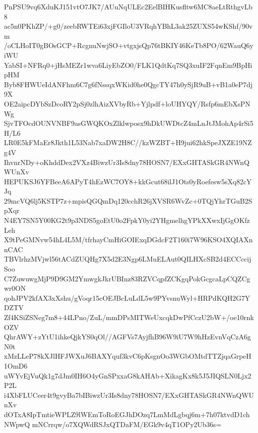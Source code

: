 PnPSU9vq6XduKJ151vtO7JK7/AUuNqULEc2EelBIHKusfltw6MC8aeLtRthgvLb8
ac5n0PKhZP/+g0/zeebRWTEi63xjFGIloU3VRqhYBhL3ak25ZUXS54wKShf/90vm
/oCLHoIT0gBOsGCP+RcgnuNwjSO+vtgxjsQp76tBKIY46KeTb8PO/62WauQ6yiWU
YabSI+NFRq0+jHsMEZr1wva6LiyEbZO0/FLK1QdtKq7SQ3xuIF2FqnEm9BpHipHM
Byb8FHWUeIdANFhm6C7g6fNssqxWKid0he0QgcTY47h0ySjR9uB+vB1a0eP7dj9X
OE2aipcDYbSzDcoRY2pSj0zlhAizXVbyRb+Yjlpdf+loUHYQY/Rsfp6mEbXsPNWg
SjvTFOcdOUNVNBF9asGWQKOxZlklwposx9hDkUWDtcZ4mLnJtJMohAp4rSi5H/L6
LR0E5kFMaEr8Jkth1L53Nab7xaDW2H8C//kzWZBT+H9jui62hkSpeJXZE19NZg4V
IhvnrNDy+oKhddDex2VXz4BiwzUr3Is8dny78HOSN7/EXxGHTASkGR4NWnQWUnXv
HEPUKSJ6YFBeeA6APyT4hEzWC7OY8+kkGcut68ilJ1Ots0yRoefesw5sXq82cYJq
29mcVQ6lj5KSTP7z+mpisQGQmDq120cchR26jXVSR6WvZc+0TQjYhrTGuB2SpXqr
N4EY7SN5Y00KG2t9p3NDS5goEtU0o2FpkY0yi2YHgmelhgYPkXXwxIjGgOKfzLeh
X9tPeGMNvw54hL4L5M/tfrhayCmHiGOIExqDGdcF2T160i7W96KSO4XQIAXnnCAC
TBVlrhzMVjwl56tACdZUQHg7X5d2E3Ngp6LMuELAut0QILHXcSB2d4ECCccijSoo
C7ZuwuwgMjP9D9GM2YmwgkJkrUBInz83RZVCqpfZCKgqPokGcgcaLpCQZCgwr0ON
qohJPV2kfAX3xXshu/gVoqr15cOEJBcLuLdL5w9PYvsnuWyl+HRPdKQH2G7YDZTV
Zf4KSiZSNeg7m8+44LPno/ZuL/mmDPsMITWeUxcqkDwPfCczU2bW+/oe10rnkOZV
QhrAWY+zYtU1ihkeQjkYS0qOl//AGFVs7AyjfhB96W9iU7W9hHzEvnVqCzA6gN0t
xMzLLeP78kXJlHFJWXuJ6BAXYquf3kvC6pKsgnOo3WGbOMtdTTZjqaGrpeH1OmD6
uWYvEjVuQk1g7dJm0IH6O4yGnSPxxaG8kAHAb+XikagKx8k5J5JIQSLN0Ljx2P2L
i4XbFLUCeer4t9gvyBa7bIBiwzUr3Is8dny78HOSN7/EXxGHTASkGR4NWnQWUnXv
dOTxA8IpTmtieWPLZ9lWEmToRoEGJhDOzq7LmMdLgbqj6m+7h07ktvdD1chNWpwQ
mNCrrqw/o7XQWdRSJxQTDaFM/EGk9v4qT1OPy2Ub36s=
